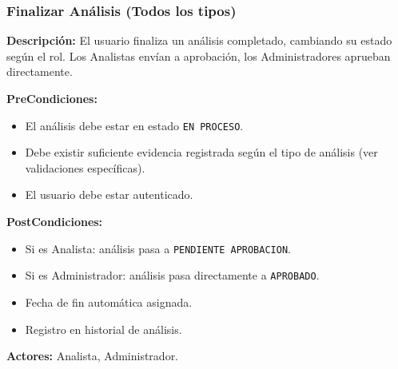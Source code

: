 \subsubsection{Finalizar Análisis (Todos los tipos)}

\textbf{Descripción:} El usuario finaliza un análisis completado, cambiando su estado según el rol. Los Analistas envían a aprobación, los Administradores aprueban directamente.

\vspace{0.5em}
\noindent\textbf{PreCondiciones:}
\begin{itemize}[nosep]
    \item El análisis debe estar en estado \texttt{EN PROCESO}.
    \item Debe existir suficiente evidencia registrada según el tipo de análisis (ver validaciones específicas).
    \item El usuario debe estar autenticado.
\end{itemize}

\vspace{0.5em}
\noindent\textbf{PostCondiciones:}
\begin{itemize}[nosep]
    \item Si es Analista: análisis pasa a \texttt{PENDIENTE APROBACION}.
    \item Si es Administrador: análisis pasa directamente a \texttt{APROBADO}.
    \item Fecha de fin automática asignada.
    \item Registro en historial de análisis.
\end{itemize}

\vspace{0.5em}
\noindent\textbf{Actores:} Analista, Administrador.

